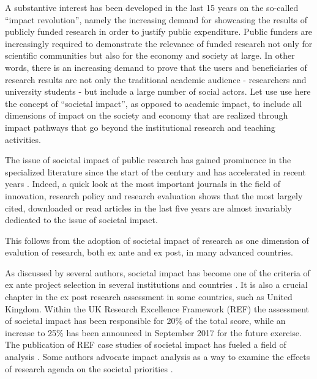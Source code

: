 \documentclass[]{book}
\begin{document}
A substantive interest has been developed in the last 15 years on the
so-called ``impact revolution'', namely the increasing demand for
showcasing the results of publicly funded research in order to justify
public expenditure. Public funders are increasingly required to
demonstrate the relevance of funded research not only for scientific
communities but also for the economy and society at large. In other
words, there is an increasing demand to prove that the users and
beneficiaries of research results are not only the traditional academic
audience - researchers and university students - but include a large
number of social actors. Let use use here the concept of ``societal
impact'', as opposed to academic impact, to include all dimensions of
impact on the society and economy that are realized through impact
pathways that go beyond the institutional research and teaching
activities.

The issue of societal impact of public research has gained prominence in
the specialized literature since the start of the century and has
accelerated in recent years \citep[\citet{erno2011measuring},
\citet{bornmann2013societal}, \citet{bornmann2014evaluate},
\citet{bornmann2017does}]{van2000evaluation}. Indeed, a quick look at
the most important journals in the field of innovation, research policy
and research evaluation shows that the most largely cited, downloaded or
read articles in the last five years are almost invariably dedicated to
the issue of societal impact.

This follows from the adoption of societal impact of research as one
dimension of evalution of research, both ex ante and ex post, in many
advanced countries.

As discussed by several authors, societal impact has become one of the
criteria of ex ante project selection in several institutions and
countries \citep[\citet{dance2013impact}]{kanninen2006methods}. It is
also a crucial chapter in the ex post research assessment in some
countries, such as United Kingdom. Within the UK Research Excellence
Framework (REF) the assessment of societal impact has been responsible
for 20\% of the total score, while an increase to 25\% has been
announced in September 2017 for the future exercise. The publication of
REF case studies of societal impact has fueled a field of analysis
\citep[\citet{samuel2015societal},
\citet{khazragui2014measuring}]{derrick2014unwrapping}. Some authors
advocate impact analysis as a way to examine the effects of research
agenda on the societal priorities \citep{cozzens2002evaluating}.
\end{document}
